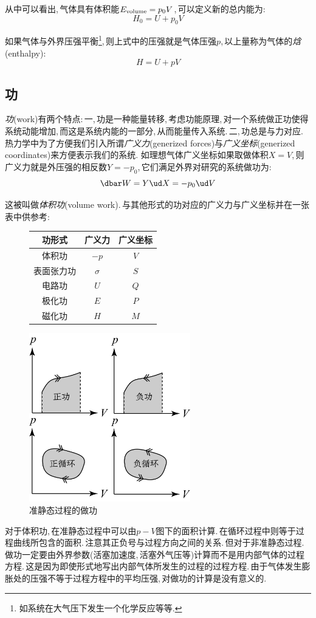 从中可以看出,\,气体具有体积能$E_{\rm volume}=p_0 V$,\,可以定义新的总内能为:
\[H_0=U+p_0 V\]

如果气体与外界压强平衡\footnote{如系统在大气压下发生一个化学反应等等.},\,则上式中的压强就是气体压强$p$,\,以上量称为气体的\emph{焓}(enthalpy):
\[H=U+pV\]


\subsection{功}
\emph{功}(work)有两个特点:\,一,\,功是一种能量转移,\,考虑功能原理,\,对一个系统做正功使得系统动能增加,\,而这是系统内能的一部分,\,从而能量传入系统.\,二,\,功总是与力对应. 热力学中为了方便我们引入所谓\emph{广义力}(generized forces)与\emph{广义坐标}(generized coordinates)来方便表示我们的系统. 如理想气体广义坐标如果取做体积$X=V$,\,则广义力就是外压强的相反数$Y=-p_0$,\,它们满足外界对研究的系统做功为:
\[\dbar W=Y\ud X=-p_0\ud V\]

这被叫做\emph{体积功}(volume work).\,与其他形式的功对应的广义力与广义坐标并在一张表中供参考:
\begin{figure}[H]
\centering
\begin{tabular}{c|c|c}
\hline
功形式		&	广义力					&	广义坐标			\\ \hline\hline
体积功		&	$-p$ 				&	$V$ 			\\ \hline
表面张力功  &	$\sigma$    		&   $S$ 		    \\ \hline
电路功		&   $U$ 				&   $Q$				\\ \hline
极化功		&	$E$ 				&  	$P$ 			\\ \hline
磁化功		&	$H$ 				& 	$M$ 			\\ \hline
\end{tabular}
\end{figure}

\begin{figure}
\centering
\vspace{-30pt}
\includegraphics[width=7cm]{image/5-1-1.png}
\caption{准静态过程的做功}
\end{figure}
对于体积功,\,在准静态过程中可以由$p-V$图下的面积计算.\,在循环过程中则等于过程曲线所包含的面积.\,注意其正负号与过程方向之间的关系.\,但对于非准静态过程.\,做功一定要由外界参数(活塞加速度,\,活塞外气压等)计算而不是用内部气体的过程方程.\,这是因为即使形式地写出内部气体所发生的过程的过程方程.\,由于气体发生膨胀处的压强不等于过程方程中的平均压强,\,对做功的计算是没有意义的.
